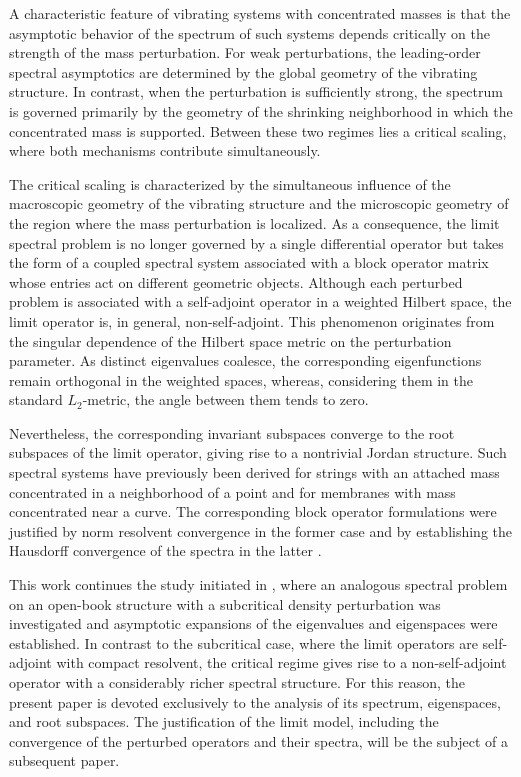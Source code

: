 \documentclass[reqno]{amsart}
\theoremstyle{definition}
\theoremstyle{remark}
\numberwithin{equation}{section}
\begin{document}
A characteristic feature of vibrating systems with concentrated masses is that the asymptotic behavior of the spectrum of such systems depends critically on the strength of the mass perturbation. For weak perturbations, the leading-order spectral asymptotics are determined by the global geometry of the vibrating structure. In contrast, when the perturbation is sufficiently strong, the spectrum is governed primarily by the geometry of the shrinking neighborhood in which the concentrated mass is supported. Between these two regimes lies a critical scaling, where both mechanisms contribute simultaneously.

The critical scaling is characterized by the simultaneous influence of the macroscopic geometry of the vibrating structure and the microscopic geometry of the region where the mass perturbation is localized. As a consequence, the limit spectral problem is no longer governed by a single differential operator but takes the form of a coupled spectral system associated with a block operator matrix whose entries act on different geometric objects. Although each perturbed problem is associated with a self-adjoint operator in a weighted Hilbert space, the limit operator is, in general, non-self-adjoint. This phenomenon originates from the singular dependence of the Hilbert space metric on the perturbation parameter. As distinct eigenvalues coalesce, the corresponding eigenfunctions remain orthogonal in the weighted spaces, 
whereas, considering them in the standard $L_2$-metric, the angle between them tends to zero.



Nevertheless, the corresponding invariant subspaces converge to the root subspaces of the limit operator, giving rise to a nontrivial Jordan structure. Such spectral systems have previously been derived for strings with an attached mass concentrated in a neighborhood of a point and for membranes with mass concentrated near a curve. The corresponding block operator formulations were justified by norm resolvent convergence in the former case \cite{Golovaty2020M2} and by establishing the Hausdorff convergence of the spectra in the latter \cite{Golovaty2022AS}.

This work continues the study initiated in \cite{GGP-JMAA2025}, where an analogous spectral problem on an open-book structure with a subcritical density
perturbation was investigated and  asymptotic expansions of the eigenvalues and eigenspaces were established. In contrast to the subcritical case, where the limit operators are self-adjoint with compact resolvent, the critical regime gives rise to a non-self-adjoint operator with a considerably richer spectral structure. For this reason, the present paper is devoted exclusively to the analysis of its spectrum, eigenspaces, and root subspaces. The justification of the limit model, including the convergence of the perturbed operators and their spectra, will be the subject of a subsequent paper.
\end{document}
